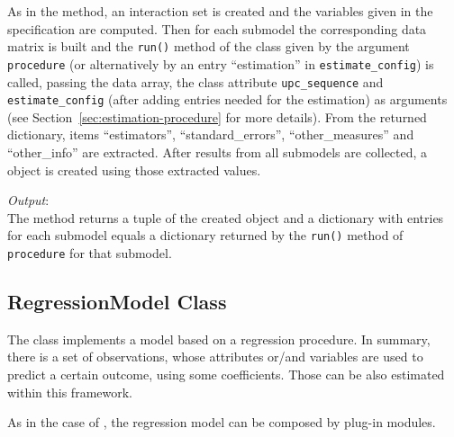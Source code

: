 {As in the  method, an interaction set is created and the
variables \variablesindex given in the specification are computed. Then for each submodel the
corresponding data matrix is built and the \verb|run()| method of the class
given by the argument \verb|procedure| (or alternatively by an entry
``estimation'' in \verb|estimate_config|) is called, passing the data array,
the class attribute \attributesindex \verb|upc_sequence| and \verb|estimate_config| (after
adding entries needed for the estimation) as arguments (see
Section~\ref{sec:estimation-procedure} for more details).  From the returned
dictionary, items ``estimators'', ``standard_errors'', ``other_measures'' and
``other_info'' are extracted. After results from all submodels are collected,
a  \coefficientsindex object is created using those extracted values.

{\it Output}:~\\[1mm]
The method returns a tuple of the created  \coefficientsindex object and a
dictionary with entries for each submodel equals a dictionary returned by the
\verb|run()| method of \verb|procedure| for that submodel.


\subsection{RegressionModel Class}
%
\label{sec:regression-model}
The  class implements a model based on a regression
procedure. In summary, there is a set of observations, whose attributes \attributesindex or/and
variables \variablesindex are used to predict a certain outcome, using some coefficients. \coefficientsindex
Those can be also estimated within this framework.

As in the case of , the regression model can be composed by
plug-in modules.

}
